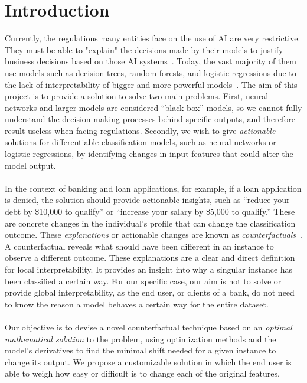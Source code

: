 \documentclass[12pt]{extarticle}
\numberwithin{equation}{section}
\begin{document}
\section{Introduction}
Currently, the regulations many entities face on the use of AI are very restrictive. They must be able to "explain" the decisions made by their models to justify business decisions based on those AI systems~\cite{cohen2021black}. Today, the vast majority of them use models such as decision trees, random forests, and logistic regressions due to the lack of interpretability 
of bigger and more powerful models~\cite{ghatasheh2014business,pointofview}. The aim of this project is to provide a solution to solve two main problems. First, neural networks and larger models are considered ``black-box'' models, so we cannot fully understand the decision-making processes behind specific outputs, and therefore result useless when facing regulations. Secondly, we wish to give \emph{actionable} solutions for differentiable classification models, such as neural networks or logistic regressions, by identifying changes in input features that could alter the model output.\\
\\
In the context of banking and loan applications, for example, if a loan application is denied, the solution should provide actionable insights, such as ``reduce your debt by \$10,000 to qualify'' or ``increase your salary by \$5,000 to qualify.'' These are concrete changes in the individual's profile that can change the classification outcome. These \emph{explanations} or actionable changes are known as \emph{counterfactuals}~\cite{wachter2017counterfactual,guidotti2024counterfactual}. A counterfactual reveals what should have been different in an instance to observe a different outcome. These explanations are a clear and direct definition for local interpretability. It provides an insight into why a singular instance has been classified a certain way. For our specific case, our aim is not to solve or provide global interpretability, as the end user, or clients of a bank, do not need to know the reason a model behaves a certain way for the entire dataset.\\
\\
Our objective is to devise a novel counterfactual technique based on an \emph{optimal mathematical solution} to the problem, using optimization methods and the model's derivatives to find the minimal shift needed for a given instance to change its output. We propose a customizable solution in which the end user is able to weigh how easy or difficult is to change each of the original features.
\end{document}
